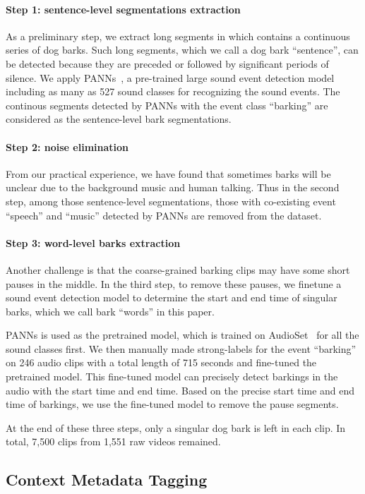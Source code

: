 \paragraph{Step 1: sentence-level segmentations extraction}
As a preliminary step, we extract long segments in which contains a continuous series of
dog barks. Such long segments, which we call a dog bark ``sentence'', can be detected because
they are preceded or followed by significant periods of silence. 
We apply PANNs~\cite{kong2020panns}, a pre-trained large sound 
event detection model including as many as 527 sound classes for recognizing the 
sound events. The continous segments detected by PANNs with the event class ``barking'' are considered as the sentence-level bark segmentations.
\paragraph{Step 2: noise elimination}
From our practical experience, we have found that sometimes barks will be unclear 
due to the background music and human talking. Thus in the second step, 
among those sentence-level segmentations, those with co-existing event ``speech'' and 
``music'' detected by PANNs are removed from the dataset.

\paragraph{Step 3: word-level barks extraction}
Another challenge is that the coarse-grained barking clips may have 
some short pauses in the middle. In the third step, to remove 
these pauses, we finetune a sound event detection model to 
determine the start and end time of singular barks, which we call bark ``words'' 
in this paper.

PANNs is used as the pretrained model, which is trained on AudioSet~\cite{gemmeke2017audio} for all the sound classes first. 
We then manually made strong-labels for the event ``barking'' on 246 audio clips with a total length of 715 seconds and fine-tuned the pretrained model.
This fine-tuned model can precisely detect barkings in the audio with the start time and end time. Based on the precise start time and end time of barkings, we use the fine-tuned model to remove the pause segments.  

At the end of these three steps, only a singular dog bark is left in each clip. 
In total, 7,500 clips from 1,551 raw videos remained. 

\subsection{Context Metadata Tagging}
\label{sec:tag}

